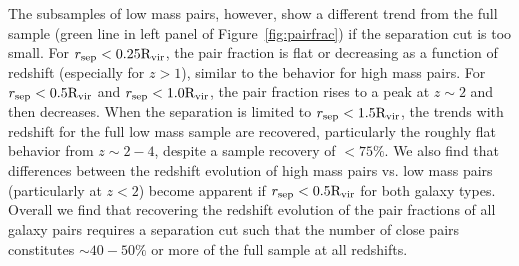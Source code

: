 \documentclass[twocolumn]{aastex631}
\newcommand{\Rvir}{\ensuremath{\rm R_{vir}}}
\begin{document}
    The subsamples of low mass pairs, however, show a different trend from the full sample (green line in left panel of Figure~\ref{fig:pairfrac}) if the separation cut is too small. 
    For $r_{\mathrm{sep}} < 0.25\Rvir$, the pair fraction is flat or decreasing as a function of redshift (especially for $z>1$), similar to the behavior for high mass pairs. 
    For $r_{\mathrm{sep}} < 0.5\Rvir$ and $r_{\mathrm{sep}} < 1.0\Rvir$, the pair fraction rises to a peak at $z\sim2$ and then decreases. 
    When the separation is limited to $r_{\mathrm{sep}} < 1.5\Rvir$, the trends with redshift for the full low mass sample are recovered, particularly the roughly flat behavior from $z\sim2-4$, despite a sample recovery of $<75\%$. 
    We also find that differences between the redshift evolution of high mass pairs vs. low mass pairs (particularly at $z<2$) become apparent if $r_{\mathrm{sep}} < 0.5\Rvir$ for both galaxy types. 
    Overall we find that recovering the redshift evolution of the pair fractions of all galaxy pairs requires a separation cut such that the number of close pairs constitutes $\sim40-50\%$ or more of the full sample at all redshifts. 
\end{document}
